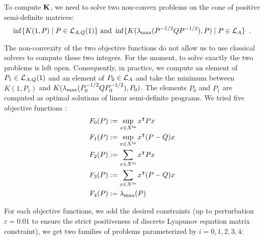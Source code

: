 \documentclass[10pt]{article}
\begin{document}
To compute $\mathbf{K}$, we need to solve two non-convex problems on the cone of positive semi-definite matrices:
\[
\inf\{K(1,P)\mid P\in\mathcal{L}_{A,Q}(1)\} \text{ and }\inf\{K(\lambda_{\operatorname{max}}(P^{-1/2}QP^{-1/2}),P)\mid P\in\mathcal{L}_{A}\} \enspace.
\]

The non-convexity of the two objective functions do not allow us to use classical solvers to compute these two integers. For the moment, to solve exactly the two problems is left open. Consequently, in practice, we compute an element of $P_1\in\mathcal{L}_{A,Q}(1)$ and an element of $P_0\in\mathcal{L}_{A}$ and take the minimum between $K(1,P_1)$ and $K(\lambda_{\operatorname{max}}(P_0^{-1/2}QP_0^{-1/2}),P_0)$. The elements $P_0$ and $P_1$  are computed as optimal solutions of linear semi-definite programs. We tried five objective functions :
\begin{align}
&F_0(P):=\sup_{x\in X^\mathrm{in}} x^\intercal P x\\
&F_1(P):=\sup_{x\in X^\mathrm{in}} x^\intercal (P-Q) x\\
&F_2(P):=\sum_{x\in X^\mathrm{in}} x^\intercal P x\\
&F_3(P):=\sum_{x\in X^\mathrm{in}} x^\intercal (P-Q) x\\
&F_4(P):=\lambda_{\operatorname{max}}(P)
\end{align} 
%
%
%
%

For each objective functions, we add the desired constraints (up to perturbation $\varepsilon=0.01$ to ensure the strict positiveness of discrete Lyapunov equation matrix constraint), we get two families of problems parameterized by $i=0,1,2,3,4$:
\end{document}
